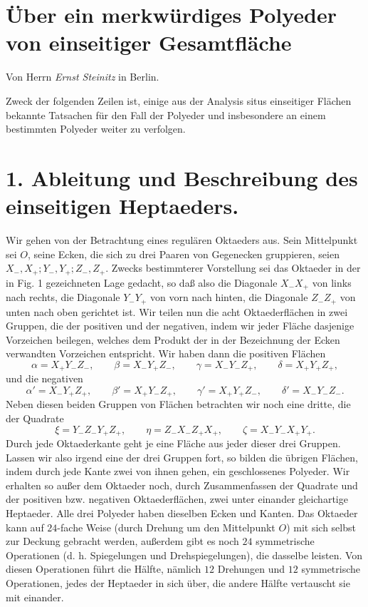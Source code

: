 \documentclass[11pt,a4paper]{article}
\begin{document}
\section*{\"Uber ein merkw\"urdiges Polyeder von einseitiger Gesamtfl\"ache}
\begin{center}
Von Herrn \emph{Ernst Steinitz} in Berlin.
\end{center}

Zweck der folgenden Zeilen ist, einige aus der Analysis situs einseitiger Fl\"achen bekannte Tatsachen f\"ur den Fall der Polyeder und insbesondere an einem bestimmten Polyeder weiter zu verfolgen.

\section*{1. Ableitung und Beschreibung des einseitigen Heptaeders.}

Wir gehen von der Betrachtung eines regul\"aren Oktaeders aus. Sein Mittelpunkt sei $O$, seine Ecken, die sich zu drei Paaren von Gegenecken gruppieren, seien $X_-,X_+;Y_-,Y_+;Z_-,Z_+$. Zwecks bestimmterer Vorstellung sei das Oktaeder in der in Fig. 1 gezeichneten Lage gedacht, so da\ss{} also die Diagonale $X_-X_+$ von links nach rechts, die Diagonale $Y_-Y_+$ von vorn nach hinten, die Diagonale $Z_-Z_+$ von unten nach oben gerichtet ist. Wir teilen nun die acht Oktaederfl\"achen in zwei Gruppen, die der positiven und der negativen, indem wir jeder Fl\"ache dasjenige Vorzeichen beilegen, welches dem Produkt der in der Bezeichnung der Ecken verwandten Vorzeichen entspricht. Wir haben dann die positiven Fl\"achen
\[
 \alpha=X_+Y_-Z_-,\qquad \beta=X_-Y_+Z_-,\qquad \gamma=X_-Y_-Z_+,\qquad \delta=X_+Y_+Z_+,
\]
und die negativen
\[
 \alpha'=X_-Y_+Z_+,\qquad \beta'=X_+Y_-Z_+,\qquad \gamma'=X_+Y_+Z_-,\qquad \delta'=X_-Y_-Z_-.
\]
Neben diesen beiden Gruppen von Fl\"achen betrachten wir noch eine dritte, die der Quadrate
\[
 \xi=Y_-Z_-Y_+Z_+,
 \qquad \eta=Z_-X_-Z_+X_+,
 \qquad \zeta=X_-Y_-X_+Y_+.
\]
Durch jede Oktaederkante geht je eine Fl\"ache aus jeder dieser drei Gruppen. Lassen wir also irgend eine der drei Gruppen fort, so bilden die \"ubrigen Fl\"achen, indem durch jede Kante zwei von ihnen gehen, ein geschlossenes Polyeder. Wir erhalten so au\ss{}er dem Oktaeder noch, durch Zusammenfassen der Quadrate und der positiven bzw. negativen Oktaederfl\"achen, zwei unter einander gleichartige Heptaeder. Alle drei Polyeder haben dieselben Ecken und Kanten. Das Oktaeder kann auf $24$-fache Weise (durch Drehung um den Mittelpunkt $O$) mit sich selbst zur Deckung gebracht werden, au\ss{}erdem gibt es noch $24$ symmetrische Operationen (d. h. Spiegelungen und Drehspiegelungen), die dasselbe leisten. Von diesen Operationen f\"uhrt die H\"alfte, n\"amlich $12$ Drehungen und $12$ symmetrische Operationen, jedes der Heptaeder in sich \"uber, die andere H\"alfte vertauscht sie mit einander.
\end{document}
